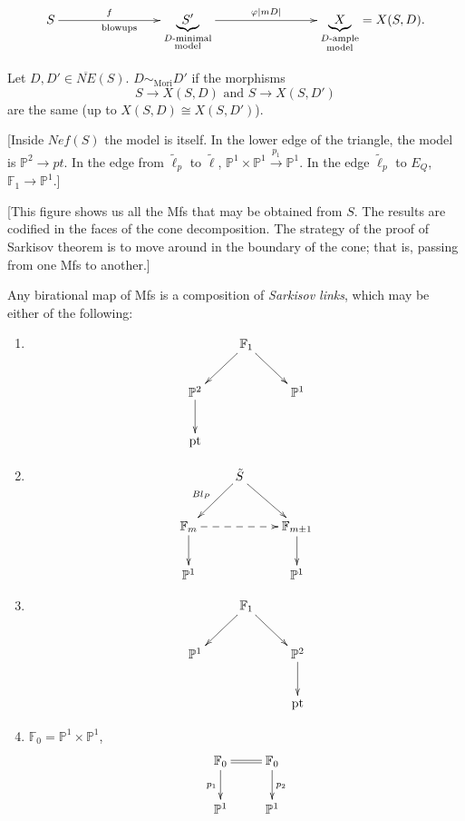 $$
\xymatrix@C=8em{
S\ar[r]^-{f}_{\text{blowups}}
&\underbrace{S'}_{\substack{
D\text{-minimal}\\\text{model}}}
\ar[r]^-{\varphi |mD|}
&\underbrace{X}_{\substack{
\text{$D$-ample} \\ \text{model}}}=X(S,D).
}
$$
\begin{definition}
\label{definition-mori-equivalence}
Let $D, D' \in \overline{NE}(S)$.
$D \sim_{\text{Mori}}D'$ if
the morphisms
$$
S \to X(S,D)\text{ and }
S \to X(S,D')
$$
are the same
(up to $X(S,D) \cong X(S,D')$).

\end{definition}

[Inside $Nef(S)$ the model is itself.
In the lower edge of the triangle,
the model is $\mathbb{P}^2 \to pt$.
In the edge from $\tilde{\ell}_p$ to
$\tilde{\ell}$,
$\mathbb{P}^1 \times \mathbb{P}^1
\xrightarrow{p_1}\mathbb{P}^1$.
In the edge $\tilde{\ell}_p$ to $E_Q$,
$\mathbb{F}_1 \to \mathbb{P}^1$.]

[This figure shows us all the Mfs that may be
obtained from $S$.
The results are codified in the faces of the
cone decomposition.
The strategy of the proof of Sarkisov theorem
is to move around in the boundary of the
cone;
that is, passing from one Mfs to another.]

\begin{theorem}
\label{theorem-sarkisov}
Any birational map of Mfs is a composition of
{\it Sarkisov links}, which may be either of
the following:
\begin{enumerate}
\item
$$
\xymatrix{
&\mathbb{F}_1
\ar[dl]\ar[dr]&\\
\mathbb{P}^2\ar[d] & & \mathbb{P}^1\\
\operatorname{pt} & &
}
$$

\item
$$
\xymatrix{
&  \tilde{S}\ar[dl]_{Bl_P}\ar[dr]\\
\mathbb{F}_m \ar[d]\ar@{-->}[rr]&&
\mathbb{F}_{m \pm 1}\ar[d]\\
\mathbb{P}^1 & & \mathbb{P}^1
}
$$
\item
$$
\xymatrix{
&\mathbb{F}_1\ar[dl]\ar[dr]\\
\mathbb{P}^1 & & \mathbb{P}^2\ar[d]\\
& & \operatorname{pt}
}
$$

\item  $\mathbb{F}_0 = \mathbb{P}^1 \times
\mathbb{P}^1$,
$$
\xymatrix{
\mathbb{F}_0\ar[d]_{p_1} \ar@{=}[r]&
\mathbb{F}_0\ar[d]^{p_2}\\
\mathbb{P}^1&\mathbb{P}^1
}
$$
\end{enumerate}
\end{theorem}

